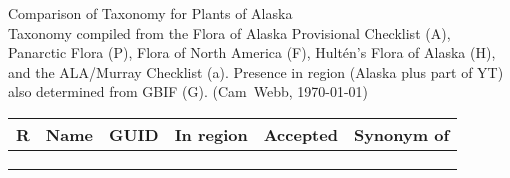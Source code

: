 \documentclass[11pt,a4paper,landscape]{article}
\begin{document}
\begin{center}
  {\LARGE \sc Comparison of Taxonomy for Plants of Alaska \\}
  \smallskip
  Taxonomy compiled from the Flora of Alaska Provisional
  Checklist (A), Panarctic Flora (P), Flora of North America (F),
  Hultén’s Flora of Alaska (H), and the ALA/Murray Checklist (a).
  Presence in region (Alaska plus part of YT) also determined from
  GBIF (G). (Cam~Webb, \today)
\end{center}

\begin{center}
  \begin{footnotesize}
\begin{longtable}{| l >{\raggedright\arraybackslash}p{} |  l | c c  c c | c c c c c | >{\raggedright\arraybackslash}p{} |}
\hline
{\bf R} & {\bf Name} & {\bf GUID} & \multicolumn{4}{|c|}{{\bf In region }} & \multicolumn{5}{|c|}{{\bf Accepted }} & {\bf Synonym of} \\
\hline
& & & & & & & & & & & & \\
\endhead
& & & & & & & & & & & & \\
\hline 
\endfoot



\end{longtable} 
\end{footnotesize}
\end{center}
\end{document}
